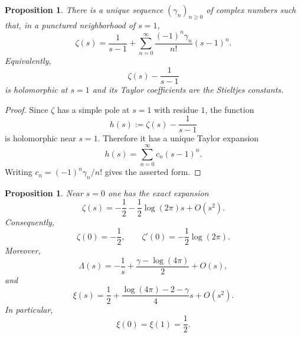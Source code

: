 \documentclass[11pt,a4paper]{article}
\numberwithin{equation}{section}
\newtheorem{proposition}[theorem]{Proposition}
\theoremstyle{definition}
\theoremstyle{remark}
\begin{document}
\begin{proposition}\label{P2:prop:stieltjes-expansion}
There is a unique sequence $(\gamma_n)_{n\ge 0}$ of complex numbers such that, in a punctured neighborhood of $s=1$,
\begin{equation}\label{P2:eq:stieltjes-expansion}
\zeta(s)=\frac{1}{s-1}+\sum_{n=0}^{\infty}\frac{(-1)^n\gamma_n}{n!}(s-1)^n.
\end{equation}
Equivalently,
\[
\zeta(s)-\frac{1}{s-1}
\]
is holomorphic at $s=1$ and its Taylor coefficients are the Stieltjes constants.
\end{proposition}

\begin{proof}
Since $\zeta$ has a simple pole at $s=1$ with residue $1$, the function
\[
h(s):=\zeta(s)-\frac{1}{s-1}
\]
is holomorphic near $s=1$.  Therefore it has a unique Taylor expansion
\[
h(s)=\sum_{n=0}^{\infty} c_n(s-1)^n.
\]
Writing $c_n=(-1)^n\gamma_n/n!$ gives the asserted form.
\end{proof}

\begin{proposition}\label{P2:prop:zeta-at-zero}
Near $s=0$ one has the exact expansion
\begin{equation}\label{P2:eq:zeta-zero-expansion}
\zeta(s)=-\frac12-\frac12\log(2\pi)s+O(s^2).
\end{equation}
Consequently,
\[
\zeta(0)=-\frac12,
\qquad
\zeta'(0)=-\frac12\log(2\pi).
\]
Moreover,
\begin{equation}\label{P2:eq:Lambda-zero-expansion}
\Lambda(s)=-\frac1s+\frac{\gamma-\log(4\pi)}{2}+O(s),
\end{equation}
and
\begin{equation}\label{P2:eq:xi-zero-expansion}
\xi(s)=\frac12+\frac{\log(4\pi)-2-\gamma}{4}s+O(s^2).
\end{equation}
In particular,
\[
\xi(0)=\xi(1)=\frac12.
\]
\end{proposition}
\end{document}
